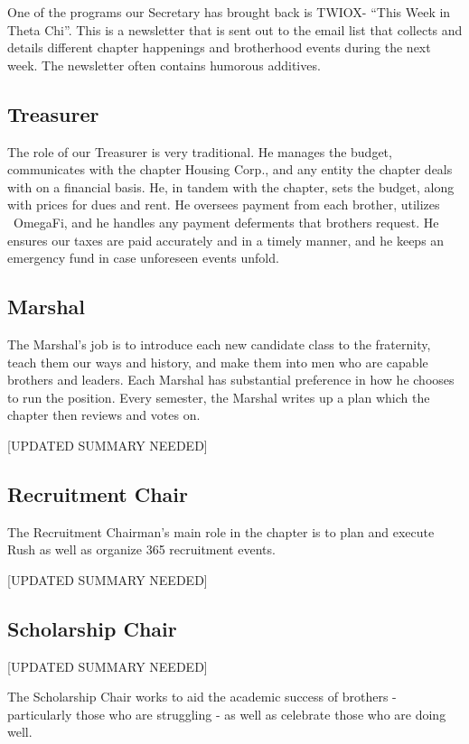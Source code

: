 	One of the programs our Secretary has brought back is TWIOX- ``This Week in Theta Chi''. This is a newsletter that is sent out to the email list that collects and details different chapter happenings and brotherhood events during the next week. The newsletter often contains humorous additives.
	
      \subsection*{Treasurer}
	The role of our Treasurer is very traditional. He manages the budget, communicates with the chapter Housing Corp., and any entity the chapter deals with on a financial basis. He, in tandem with the chapter, sets the budget, along with prices for dues and rent. He oversees payment from each brother, utilizes  OmegaFi, and he handles any payment deferments that brothers request. He ensures our taxes are paid accurately and in a timely manner, and he keeps an emergency fund in case unforeseen events unfold. 
      
      \subsection*{Marshal}
	The Marshal's job is to introduce each new candidate class to the fraternity, teach them our ways and history, and make them into men who are capable brothers and leaders. Each Marshal has substantial preference in how he chooses to run the position. Every semester, the Marshal writes up a plan which the chapter then reviews and votes on. 
	
	[UPDATED SUMMARY NEEDED]
	
      \subsection*{Recruitment Chair}
	The Recruitment Chairman's main role in the chapter is to plan and execute Rush as well as organize 365 recruitment events. 
	
	[UPDATED SUMMARY NEEDED]
	
      \subsection*{Scholarship Chair}
	[UPDATED SUMMARY NEEDED]
	
	The Scholarship Chair works to aid the academic success of brothers - particularly those who are struggling - as well as celebrate those who are doing well.

